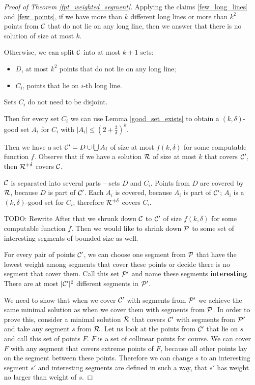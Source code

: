 \begin{proof}[Proof of Theorem \ref{fpt_weighted_segment}]

Applying the claims \ref{few_long_lines} and \ref{few_points},
if we have more than $k$ different long lines
or more than $k^2$ points from $\mathcal{C}$
that do not lie on any long line, then we answer that
there is no solution of size at most $k$.

Otherwise, we can split $\mathcal{C}$ into at most $k+1$ sets:
\begin{itemize}
\item $D$, at most $k^2$ points that do not lie on any long line;
\item $C_i$, points that lie on $i$-th long line.
\end{itemize}
Sets $C_i$ do not need to be disjoint.

Then for every set $C_i$ we can use Lemma \ref{good_set_exists}
to obtain a $(k,\delta)$-good set $A_i$
for $C_i$ with $|A_i| \le (2+\frac{2}{\delta})^k$.

Then we have a set $\mathcal{C}' = D \cup \bigcup A_i$ of size at most $f(k, \delta)$
for some computable function $f$.
Observe that if we have a solution $\mathcal{R}$ of size at most $k$
that covers $\mathcal{C}'$, then $\mathcal{R}^{+\delta}$ covers $\mathcal{C}$.

$\mathcal{C}$ is separated into several parts -- sets $D$ and $C_i$.
Points from $D$ are covered by $\mathcal{R}$, because $D$ is part of $\mathcal{C}'$.
Each $A_i$ is covered, because $A_i$ is part of $\mathcal{C}'$;
$A_i$ is a $(k,\delta)$-good set for $C_i$, therefore $\mathcal{R}^{+\delta}$ covers $C_i$.

TODO: Rewrite
After that we shrunk down $\mathcal{C}$ to $\mathcal{C}'$ of size $f(k, \delta)$
for some computable function $f$.
Then we would like to shrink down $\mathcal{P}$ to some set of
interesting segments of bounded size as well.

For every pair of points $\mathcal{C}'$, we can choose one segment from
$\mathcal{P}$ that have the lowest weight
among segments that cover these points 
or decide there is no segment that cover them.
Call this set $\mathcal{P}'$ and name these segments \textbf{interesting}.
There are at most $|\mathcal{C}'|^2$ different segments in $\mathcal{P}'$.

We need to show that when we cover $\mathcal{C}'$
with segments from $\mathcal{P}'$ we achieve the same minimal
solution as when we cover them with segments from $\mathcal{P}$. 
In order to prove this,
consider a minimal solution $\mathcal{R}$ that covers $\mathcal{C}'$
with segments from $\mathcal{P}'$
and take any segment $s$ from $\mathcal{R}$.
Let us look at the points from $\mathcal{C}'$ that lie on $s$
and call this set of points $F$.
$F$ is a set of collinear points for course.
We can cover $F$ with any segment that covers extreme points of $F$,
because all other points lay on the segment between these points.
Therefore we can change $s$ to an interesting segment $s'$
and interesting segments are defined in such a way, that $s'$
has weight no larger than weight of $s$.


\end{proof}
